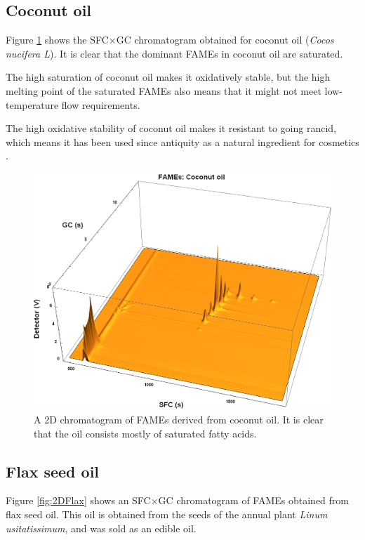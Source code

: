 \subsection{Coconut oil}

Figure \ref{fig:2DCoconut} shows the SFC×GC chromatogram obtained for coconut
oil (\textit{Cocos nucifera L}). It is clear that the dominant FAMEs in coconut
oil are saturated.

The high saturation of coconut oil makes it oxidatively stable, but the high
melting point of the saturated FAMEs also means that it might not meet
low-temperature flow requirements.

The high oxidative stability of coconut oil makes it resistant to going rancid,
which means it has been used since antiquity as a natural ingredient for cosmetics
\autocite{Berdick1972}.

\begin{figure}
\centering
\includegraphics[width=\textwidth]{Figures/Coconut.png}
\decoRule

\caption[SFC×GC of coconut oil]{A 2D chromatogram of FAMEs derived from
coconut oil. It is clear that the oil consists mostly of saturated fatty
acids.}

\label{fig:2DCoconut}
\end{figure}

\subsection{Flax seed oil}

Figure \ref{fig:2DFlax} shows an SFC×GC chromatogram of FAMEs obtained from flax
seed oil. This oil is obtained from the seeds of the annual plant \textit{Linum
usitatissimum}, and was sold as an edible oil.


